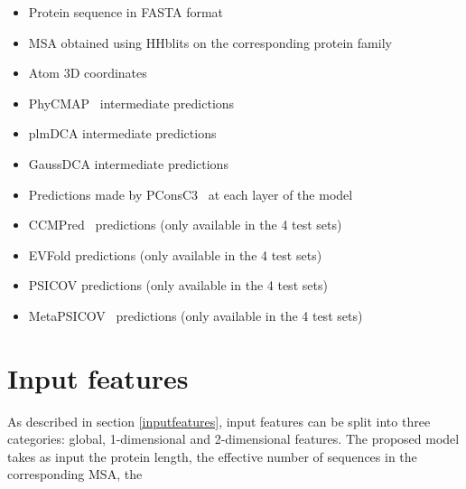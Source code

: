   \begin{itemize}
    \item Protein sequence in FASTA format
    \item MSA obtained using HHblits on the corresponding protein family
    \item Atom 3D coordinates
    \item PhyCMAP~\cite{PhyCMap} intermediate predictions
    \item plmDCA intermediate predictions
    \item GaussDCA intermediate predictions
    \item Predictions made by PConsC3~\cite{Skwark079673} at each layer of the model
    \item CCMPred~\cite{CCMPred} predictions (only available in the 4 test sets)
    \item EVFold predictions (only available in the 4 test sets)
    \item PSICOV predictions (only available in the 4 test sets)
    \item MetaPSICOV~\cite{MetaPSICOV} predictions (only available in the 4 test sets)
  \end{itemize}



\section{Input features}

  As described in section \ref{inputfeatures}, input features can be split into three categories:
  global, 1-dimensional and 2-dimensional features.
  The proposed model takes as input the protein length, the effective number of sequences in the corresponding MSA,
  the 

